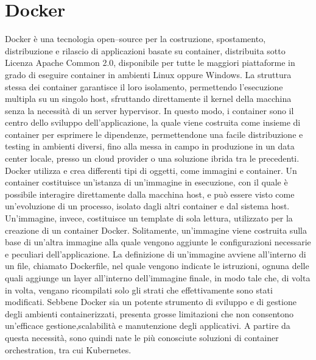 \section{Docker}
Docker è una tecnologia open–source per la costruzione, spostamento, distribuzione e rilascio di
applicazioni basate su container, distribuita sotto Licenza Apache Common 2.0, disponibile per
tutte le maggiori piattaforme in grado di eseguire container in ambienti Linux oppure Windows.
La struttura stessa dei container garantisce il loro isolamento, permettendo l’esecuzione multipla
su un singolo host, sfruttando direttamente il kernel della macchina senza la necessità di un server
hypervisor. In questo modo, i container sono il centro dello sviluppo dell’applicazione, la quale
viene costruita come insieme di container per esprimere le dipendenze, permettendone una facile
distribuzione e testing in ambienti diversi, fino alla messa in campo in produzione in un data
center locale, presso un cloud provider o una soluzione ibrida tra le precedenti.
Docker utilizza e crea differenti tipi di oggetti, come immagini e container. Un container costituisce 
un’istanza di un’immagine in esecuzione, con il quale è possibile interagire direttamente dalla
macchina host, e può essere visto come un’evoluzione di un processo, isolato dagli altri container
e dal sistema host.
Un’immagine, invece, costituisce un template di sola lettura, utilizzato per la creazione di un
container Docker. Solitamente, un’immagine viene costruita sulla base di un’altra immagine alla
quale vengono aggiunte le configurazioni necessarie e peculiari dell’applicazione. La definizione
di un’immagine avviene all’interno di un file, chiamato Dockerfile, nel quale vengono indicate
le istruzioni, ognuna delle quali aggiunge un layer all’interno dell’immagine finale, in modo tale
che, di volta in volta, vengano ricompilati solo gli strati che effettivamente sono stati modificati.
Sebbene Docker sia un potente strumento di sviluppo e di gestione degli ambienti containerizzati, presenta grosse limitazioni che non consentono un'efficace gestione,scalabilità e manutenzione degli applicativi.
A partire da questa necessità, sono quindi nate le più conosciute soluzioni di container orchestration, tra cui Kubernetes.
